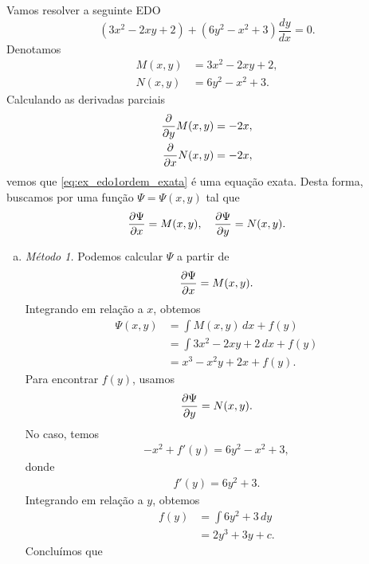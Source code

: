\begin{ex}\label{ex:edo1ordem_exata}
  Vamos resolver a seguinte EDO
  \begin{equation}\label{eq:ex_edo1ordem_exata}
    (3x^2 - 2xy + 2) + (6y^2 - x^2 + 3)\frac{dy}{dx} = 0.
  \end{equation}
  Denotamos
  \begin{align}
    M(x,y) &= 3x^2 - 2xy + 2,\\
    N(x,y) &= 6y^2 - x^2 + 3.
  \end{align}
  Calculando as derivadas parciais
  \begin{align}
    \frac{\partial}{\partial y}M(x,y) = -2x, \\
    \frac{\partial}{\partial x}N(x,y) = -2x,
  \end{align}
  vemos que \eqref{eq:ex_edo1ordem_exata} é uma equação exata. Desta forma, buscamos por uma função $\Psi = \Psi(x,y)$ tal que
  \begin{equation}
    \frac{\partial\Psi}{\partial x} = M(x,y),\quad\frac{\partial\Psi}{\partial y} = N(x,y).
  \end{equation}
  \begin{enumerate}[a)]
  \item \emph{Método 1.}
    Podemos calcular $\Psi$ a partir de
    \begin{equation}
      \frac{\partial\Psi}{\partial x} = M(x,y).
    \end{equation}
    Integrando em relação a $x$, obtemos
    \begin{align}
      \Psi(x,y) &= \int M(x,y)\,dx + f(y)\\
      &= \int 3x^2-2xy+2\,dx + f(y) \\
      &= x^3-x^2y+2x + f(y).
    \end{align}
    Para encontrar $f(y)$, usamos
    \begin{equation}
      \frac{\partial\Psi}{\partial y} = N(x,y).
    \end{equation}
    No caso, temos
    \begin{align}
      -x^2 + f'(y) = 6y^2 - x^2 + 3,
    \end{align}
    donde
    \begin{align}
      f'(y) = 6y^2 + 3.
    \end{align}
    Integrando em relação a $y$, obtemos
    \begin{align}
      f(y) &= \int 6y^2 + 3\,dy \\
      &= 2y^3 + 3y + c.
    \end{align}
    Concluímos que
    \begin{equation}

\end{equation}
\end{enumerate}
\end{ex}
